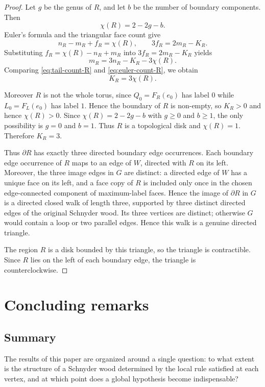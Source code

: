 \documentclass[11pt]{amsart}
\theoremstyle{plain}
\theoremstyle{definition}
\theoremstyle{remark}
\begin{document}
\begin{proof}
Let $g$ be the genus of $R$, and let $b$ be the number of boundary components. Then
\[
  \chi(R) = 2 - 2g - b.
\]
Euler's formula and the triangular face count give
\[
  n_R - m_R + f_R = \chi(R),
  \qquad
  3 f_R = 2 m_R - K_R.
\]
Substituting $f_R = \chi(R) - n_R + m_R$ into $3 f_R = 2 m_R - K_R$ yields
\begin{equation}
\label{eq:euler-count-R}
  m_R = 3 n_R - K_R - 3 \chi(R).
\end{equation}
Comparing \eqref{eq:tail-count-R} and \eqref{eq:euler-count-R}, we obtain
\[
  K_R = 3 \chi(R).
\]

Moreover $R$ is not the whole torus, since $Q_0 = F_R(e_0)$ has label $0$ while $L_0 = F_L(e_0)$ has label $1$. Hence the boundary of $R$ is non-empty, so $K_R > 0$ and hence $\chi(R) > 0$. Since $\chi(R) = 2 - 2g - b$ with $g \ge 0$ and $b \ge 1$, the only possibility is $g = 0$ and $b = 1$. Thus $R$ is a topological disk and $\chi(R) = 1$. Therefore $K_R = 3$.

Thus $\partial R$ has exactly three directed boundary edge occurrences. Each boundary edge occurrence of $R$ maps to an edge of $W$, directed with $R$ on its left. Moreover, the three image edges in $G$ are distinct: a directed edge of $W$ has a unique face on its left, and a face copy of $R$ is included only once in the chosen edge-connected component of maximum-label faces. Hence the image of $\partial R$ in $G$ is a directed closed walk of length three, supported by three distinct directed edges of the original Schnyder wood. Its three vertices are distinct; otherwise $G$ would contain a loop or two parallel edges. Hence this walk is a genuine directed triangle.

The region $R$ is a disk bounded by this triangle, so the triangle is contractible. Since $R$ lies on the left of each boundary edge, the triangle is counterclockwise.
\end{proof}


\section{Concluding remarks}
\label{sec:conclusion}

\begingroup
\renewcommand{\addcontentsline}[3]{}

\subsection*{Summary}
The results of this paper are organized around a single question: to what extent is the structure of a Schnyder wood determined by the local rule satisfied at each vertex, and at which point does a global hypothesis become indispensable?
\end{document}
